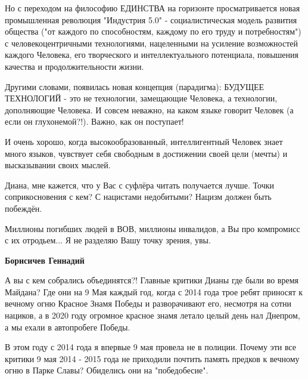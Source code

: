 \begin{itemize}
Но с переходом на философию ЕДИНСТВА на горизонте просматривается новая
промышленная революция "Индустрия 5.0" - социалистическая модель развития
общества ("от каждого по способностям, каждому по его труду и потребностям") с
человекоцентричными технологиями, нацеленными на усиление возможностей каждого
Человека, его творческого и интеллектуального потенциала, повышения качества и
продолжительности жизни. 

Другими словами, появилась новая концепция (парадигма): БУДУЩЕЕ ТЕХНОЛОГИЙ -
это не технологии, замещающие Человека, а технологии, дополняющие Человека. И
совсем неважно, на каком языке говорит Человек (а если он глухонемой?!). Важно,
как он поступает! 

И очень хорошо, когда высокообразованный, интеллигентный Человек знает много
языков, чувствует себя свободным в достижении своей цели (мечты) и высказывании
своих мыслей.


Диана, мне кажется, что у Вас с суфлёра читать получается лучше. Точки
соприкосновения с кем? С нацистами недобитыми? Нацизм должен быть побеждён.

Миллионы погибших людей в ВОВ, миллионы инвалидов, а Вы про компромисс с их
отродьем... Я не разделяю Вашу точку зрения, увы.

\begin{itemize}

\par

\textbf{Борисичев Геннадий} 

А вы с кем собрались объединятся?! Главные критики Дианы где были во время
Майдана? Где они на 9 Мая каждый год, когда с 2014 года трое ребят приносят к
вечному огню Красное Знамя Победы и разворачивают его, несмотря на сотни
нациков, а в 2020 году огромное красное знамя летало целый день нал Днепром, а
мы ехали в автопробеге Победы. 

В этом году с 2014 года я впервые 9 мая провела не в полиции. Почему эти все
критики 9 мая 2014 - 2015 года не приходили почтить память предков к вечному
огню в Парке Славы?  Обиделись они на "победобесие". 


\end{itemize}
\end{itemize}
